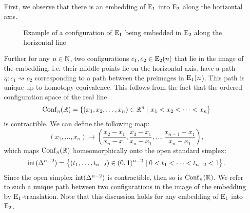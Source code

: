 \begin{rem}[$\E_1$ translation]\label{rem:e1-translation} First, we observe that
    there is an embedding of $\E_1$ into $\operatorname{E}_2$ along the horizontal axis.

    \begin{figure}[h!]
        \begin{center}
        \end{center}
        \caption{Example of a configuration of $\E_1$ being embedded in $\operatorname{E}_2$
        along the horizontal line}
    \end{figure}
    Further for any $n \in \mathbb{N}$, two configurations $c_1, c_2 \in \operatorname{E}_2(n)$ that
    lie in the image of the embedding, i.e. their middle points lie on the
    horizontal axis, have a path $\eta \colon c_1 \rightsquigarrow c_2$
    corresponding to a path between the preimages in $\operatorname{E}_1(n$). This path is
    unique up to homotopy equivalence. This follows from the fact that the
    ordered configuration space of the real line
    \[
        \operatorname{Conf}_n(\mathbb{R}) = \left\{ (x_1, x_2, \dots, x_n) \in \mathbb{R}^n \mid x_1 < x_2 < \dots < x_n \right\}
    \]
    is contractible. We can define the following map:
    \[
    (x_1, \dots, x_n) \mapsto \left( \frac{x_2 - x_1}{x_n - x_1}, \frac{x_3 - x_1}{x_n - x_1}, \dots, \frac{x_{n-1} - x_1}{x_n - x_1} \right),
    \]
    which maps $\operatorname{Conf}_n(\mathbb{R})$ homeomorphically onto the open standard simplex:
    \[
    \operatorname{int}(\Delta^{n-2}) = \left\{ (t_1, \dots, t_{n-2}) \in (0,1)^{n-2} \mid 0 < t_1 < \dots < t_{n-2} < 1 \right\}.
    \]
    Since the open simplex $\operatorname{int}(\Delta^{n-2})$ is contractible, then so is
    $\operatorname{Conf}_n(\mathbb{R})$.
    We refer to such a unique path between two configurations in the image of
    the embedding by $\E_1$-translation. Note that this discussion holds for any
    embedding of $\E_1$ into $\operatorname{E}_2$.
\end{rem}

